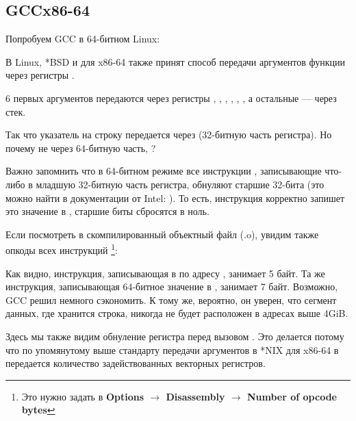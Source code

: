 \subsection{GCC\EMDASH{}x86-64}

Попробуем GCC в 64-битном Linux:



В Linux, *BSD и \MacOSX для x86-64 также принят способ передачи аргументов функции через регистры \SysVABI.

6 первых аргументов передаются через регистры \RDI, \RSI, \RDX, \RCX, , , а остальные --- через стек.

Так что указатель на строку передается через \EDI (32-битную часть регистра).
Но почему не через 64-битную часть, \RDI?

Важно запомнить что в 64-битном режиме все инструкции \MOV, записывающие что-либо в младшую 32-битную часть регистра, обнуляют старшие 32-бита (это можно найти в документации от Intel: ).
То есть, инструкция  корректно запишет это значение в \RAX, старшие биты сбросятся в ноль.

Если посмотреть в \IDA скомпилированный объектный файл (.o), увидим также опкоды всех инструкций
\footnote{Это нужно задать в \textbf{Options $\rightarrow$ Disassembly $\rightarrow$ Number of opcode bytes}}:



\label{hw_EDI_instead_of_RDI}
Как видно, инструкция, записывающая в \EDI по адресу , занимает 5 байт.
Та же инструкция, записывающая 64-битное значение в \RDI, занимает 7 байт.
Возможно, GCC решил немного сэкономить.
К тому же, вероятно, он уверен, что сегмент данных, где хранится строка, никогда не будет расположен в адресах выше 4\gls{GiB}.

\label{SysVABI_input_EAX}
Здесь мы также видим обнуление регистра \EAX перед вызовом \printf.
Это делается потому что по упомянутому выше стандарту передачи аргументов в *NIX для x86-64 в \EAX передается количество задействованных векторных регистров.

